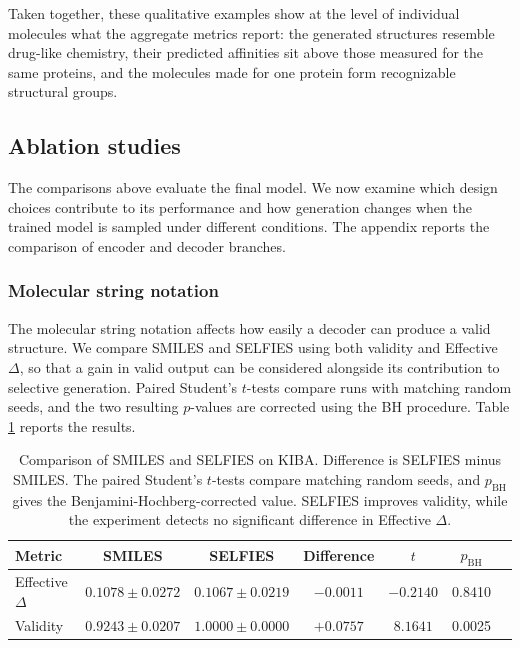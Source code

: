 \documentclass[a4paper,12pt]{article}
\begin{document}
Taken together, these qualitative examples show at the level of individual molecules what the
aggregate metrics report: the generated structures resemble drug-like chemistry, their
predicted affinities sit above those measured for the same proteins, and the molecules made
for one protein form recognizable structural groups.

\FloatBarrier
\subsection{Ablation studies}\label{sec:temp}
The comparisons above evaluate the final model. We now examine which design choices contribute to its performance and how generation changes when the trained model is sampled under different conditions. The appendix reports the comparison of encoder and decoder branches.

\subsubsection{Molecular string notation}\label{sec:notation}

The molecular string notation affects how easily a decoder can produce a valid structure. We compare SMILES and SELFIES using both validity and Effective $\Delta$, so that a gain in valid output can be considered alongside its contribution to selective generation. Paired Student's $t$-tests compare runs with matching random seeds, and the two resulting $p$-values are corrected using the BH procedure. Table \ref{tab:e3_tests} reports the results.

\begin{table}[ht]
    \centering
    \caption[SMILES and SELFIES on KIBA.]{Comparison of SMILES and SELFIES on KIBA. Difference is SELFIES minus SMILES. The paired Student's $t$-tests compare matching random seeds, and $p_{\mathrm{BH}}$ gives the Benjamini-Hochberg-corrected value. SELFIES improves validity, while the experiment detects no significant difference in Effective $\Delta$.}
    \label{tab:e3_tests}
    \begin{tabular}{lcccccc}
        \toprule
        \textbf{Metric} & \textbf{SMILES} & \textbf{SELFIES} & \textbf{Difference} & \textbf{$t$} & \textbf{$p_{\mathrm{BH}}$} \\
        \midrule
        Effective $\Delta$ & $0.1078 \pm 0.0272$ & $0.1067 \pm 0.0219$ & $-0.0011$  & $-0.2140$ & 0.8410 \\
        Validity & $0.9243 \pm 0.0207$ & $1.0000 \pm 0.0000$ & $+0.0757$ & $8.1641$ & 0.0025 \\
        \bottomrule
    \end{tabular}
\end{table}
\end{document}
